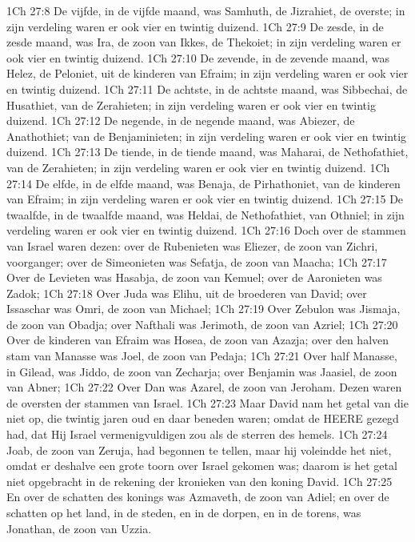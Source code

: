 1Ch 27:8  De vijfde, in de vijfde maand, was Samhuth, de Jizrahiet, de overste; in zijn verdeling waren er ook vier en twintig duizend.
1Ch 27:9  De zesde, in de zesde maand, was Ira, de zoon van Ikkes, de Thekoiet; in zijn verdeling waren er ook vier en twintig duizend.
1Ch 27:10  De zevende, in de zevende maand, was Helez, de Peloniet, uit de kinderen van Efraim; in zijn verdeling waren er ook vier en twintig duizend.
1Ch 27:11  De achtste, in de achtste maand, was Sibbechai, de Husathiet, van de Zerahieten; in zijn verdeling waren er ook vier en twintig duizend.
1Ch 27:12  De negende, in de negende maand, was Abiezer, de Anathothiet; van de Benjaminieten; in zijn verdeling waren er ook vier en twintig duizend.
1Ch 27:13  De tiende, in de tiende maand, was Maharai, de Nethofathiet, van de Zerahieten; in zijn verdeling waren er ook vier en twintig duizend.
1Ch 27:14  De elfde, in de elfde maand, was Benaja, de Pirhathoniet, van de kinderen van Efraim; in zijn verdeling waren er ook vier en twintig duizend.
1Ch 27:15  De twaalfde, in de twaalfde maand, was Heldai, de Nethofathiet, van Othniel; in zijn verdeling waren er ook vier en twintig duizend.
1Ch 27:16  Doch over de stammen van Israel waren dezen: over de Rubenieten was Eliezer, de zoon van Zichri, voorganger; over de Simeonieten was Sefatja, de zoon van Maacha;
1Ch 27:17  Over de Levieten was Hasabja, de zoon van Kemuel; over de Aaronieten was Zadok;
1Ch 27:18  Over Juda was Elihu, uit de broederen van David; over Issaschar was Omri, de zoon van Michael;
1Ch 27:19  Over Zebulon was Jismaja, de zoon van Obadja; over Nafthali was Jerimoth, de zoon van Azriel;
1Ch 27:20  Over de kinderen van Efraim was Hosea, de zoon van Azazja; over den halven stam van Manasse was Joel, de zoon van Pedaja;
1Ch 27:21  Over half Manasse, in Gilead, was Jiddo, de zoon van Zecharja; over Benjamin was Jaasiel, de zoon van Abner;
1Ch 27:22  Over Dan was Azarel, de zoon van Jeroham. Dezen waren de oversten der stammen van Israel.
1Ch 27:23  Maar David nam het getal van die niet op, die twintig jaren oud en daar beneden waren; omdat de HEERE gezegd had, dat Hij Israel vermenigvuldigen zou als de sterren des hemels.
1Ch 27:24  Joab, de zoon van Zeruja, had begonnen te tellen, maar hij voleindde het niet, omdat er deshalve een grote toorn over Israel gekomen was; daarom is het getal niet opgebracht in de rekening der kronieken van den koning David.
1Ch 27:25  En over de schatten des konings was Azmaveth, de zoon van Adiel; en over de schatten op het land, in de steden, en in de dorpen, en in de torens, was Jonathan, de zoon van Uzzia.
